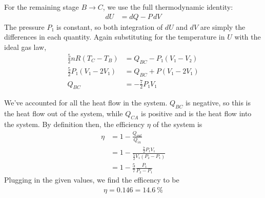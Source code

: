 For the remaining stage $B \rightarrow C$, we use the full thermodynamic
identity:
\begin{align*}
    dU &= dQ - P\,dV
\end{align*}
The pressure $P₁$ is constant, so both integration of $dU$ and $dV$ are simply
the differences in each quantity. Again substituting for the temperature in
$U$ with the ideal gas law,
\begin{align*}
    \frac 52 nR(T_C - T_B) &= Q_{BC} - P₁(V₁ - V₂) \\
    \frac 52 P₁(V₁ - 2V₁) &= Q_{BC} + P(V₁ - 2V₁) \\
    Q_{BC} &= -\frac 72 P₁V₁
\end{align*}

We've accounted for all the heat flow in the system. $Q_{BC}$ is negative, so
this is the heat flow out of the system, while $Q_{CA}$ is positive and is the
heat flow into the system. By definition then, the efficiency $η$ of the system
is
\begin{align*}
    η &= 1 - \frac{Q_{out}}{Q_{in}} \\
    {}&= 1 - \frac{\frac 72 P₁ V₁}{\frac 52 V₁ (P₂ - P₁)} \\
    {}&= 1 - \frac 57 \frac{P₁}{P₂ - P₁}
\end{align*}
Plugging in the given values, we find the efficency to be
\begin{align}
    \boxed{
    η = 0.146 = \SI{14.6}{\percent}
    }
\end{align}

